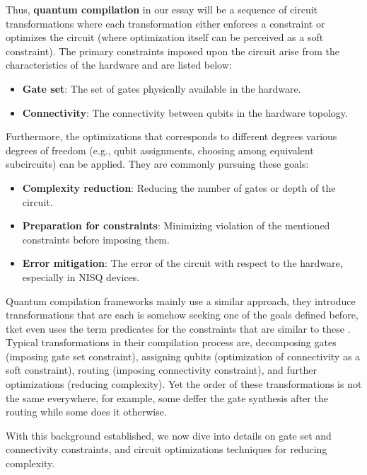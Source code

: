 Thus, \textbf{quantum compilation} in our essay will be a sequence of circuit transformations where each transformation either enforces a constraint or optimizes the circuit (where optimization itself can be perceived as a soft constraint). The primary constraints imposed upon the circuit arise from the characteristics of the hardware and are listed below:

\begin{itemize}
  \item \textbf{Gate set}: The set of gates physically available in the hardware.
  \item \textbf{Connectivity}: The connectivity between qubits in the hardware topology.
\end{itemize}
  
Furthermore, the optimizations that corresponds to different degrees various degrees of freedom (e.g., qubit assignments, choosing among equivalent subcircuits) can be applied. They are commonly pursuing these goals:

\begin{itemize}
  \item \textbf{Complexity reduction}: Reducing the number of gates or depth of the circuit.
  \item \textbf{Preparation for constraints}: Minimizing violation of the mentioned constraints before imposing them. 
  \item \textbf{Error mitigation}: The error of the circuit with respect to the hardware, especially in NISQ devices.
\end{itemize}

Quantum compilation frameworks mainly use a similar approach, they introduce transformations that are each is somehow seeking one of the goals defined before, tket even uses the term predicates for the constraints that are similar to these \cite{sivarajah2021}. Typical transformations in their compilation process are, decomposing gates (imposing gate set constraint), assigning qubits (optimization of connectivity as a soft constraint), routing (imposing connectivity constraint), and further optimizations (reducing complexity). Yet the order of these transformations is not the same everywhere, for example, some \cite{lao2021,qiskit2023} deffer the gate synthesis after the routing while some \cite{wille2020,sivarajah2021} does it otherwise.

With this background established, we now dive into details on gate set and connectivity constraints, and circuit optimizations techniques for reducing complexity.

